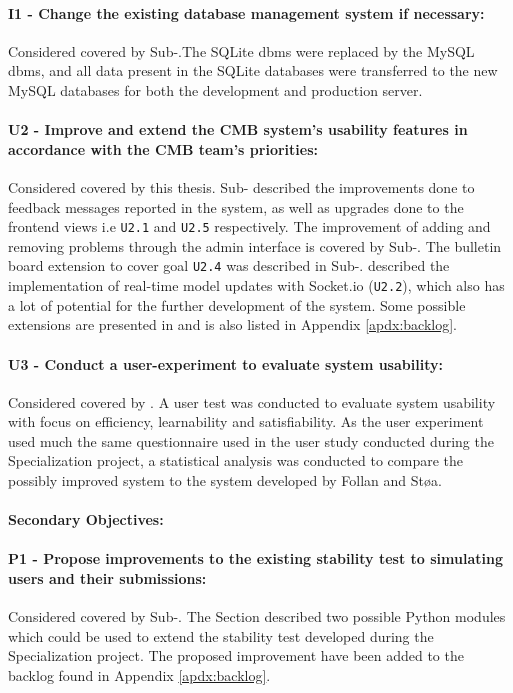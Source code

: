 \paragraph*{I1 - Change the existing database management system if necessary:} Considered covered by Sub-.The SQLite \gls{dbms} were replaced by the MySQL \gls{dbms}, and all data present in the SQLite databases were transferred to the new MySQL databases for both the development and production server.

\paragraph*{U2 - Improve and extend the CMB system’s usability features in accordance with the CMB team’s priorities:} Considered covered by this thesis. Sub- described the improvements done to feedback messages reported in the system, as well as upgrades done to the frontend views i.e \texttt{U2.1} and \texttt{U2.5} respectively. The improvement of adding and removing problems through the admin interface is covered by Sub-. The bulletin board extension to cover goal \texttt{U2.4} was described in Sub-.  described the implementation of real-time model updates with Socket.io (\texttt{U2.2}), which also has a lot of potential for the further development of the system. Some possible extensions are presented in  and is also listed in Appendix \ref{apdx:backlog}.

\paragraph*{U3 - Conduct a user-experiment to evaluate system usability:} Considered covered by . A user test was conducted to evaluate system usability with focus on efficiency, learnability and satisfiability. As the user experiment used much the same questionnaire used in the user study conducted during the Specialization project, a statistical analysis was conducted to compare the possibly improved system to the system developed by Follan and Støa.

\paragraph*{Secondary Objectives:} \hfill

\paragraph*{P1 - Propose improvements to the existing stability test to simulating users and their submissions:} Considered covered by Sub-. The Section described two possible Python modules which could be used to extend the stability test developed during the Specialization project. The proposed improvement have been added to the backlog found in Appendix \ref{apdx:backlog}.

